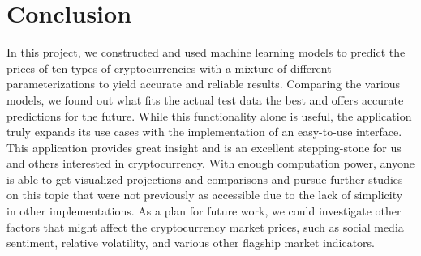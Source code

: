 \documentclass[compsoc]{IEEEtran}
\begin{document}
\section{Conclusion} 
In this project, we constructed and used machine learning models to predict the prices of ten types of cryptocurrencies with a mixture of different parameterizations to yield accurate and reliable results. Comparing the various models, we found out what fits the actual test data the best and offers accurate predictions for the future. While this functionality alone is useful, the application truly expands its use cases with the implementation of an easy-to-use interface. This application provides great insight and is an excellent stepping-stone for us and others interested in cryptocurrency. With enough computation power, anyone is able to get visualized projections and comparisons and pursue further studies on this topic that were not previously as accessible due to the lack of simplicity in other implementations. As a plan for future work, we could investigate other factors that might affect the cryptocurrency market prices, such as social media sentiment, relative volatility, and various other flagship market indicators.


\nocite{*}
\end{document}
